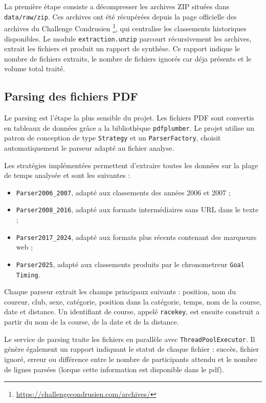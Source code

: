 \documentclass[12pt,a4paper]{article}
\begin{document}
La première étape consiste a décompresser les archives ZIP situées dans \texttt{data/raw/zip}. Ces archives ont été récupérées depuis la page officielle des archives du Challenge Condrusien \footnote{\url{https://challengecondrusien.com/archives/}}, qui centralise les classements historiques disponibles. Le module \texttt{extraction.unzip} parcourt récursivement les archives, extrait les fichiers et produit un rapport de synthèse. Ce rapport indique le nombre de fichiers extraits, le nombre de fichiers ignorés car déja présents et le volume total traité.

\subsection{Parsing des fichiers PDF}

Le parsing est l'étape la plus sensible du projet. Les fichiers PDF sont convertis en tableaux de données grâce a la bibliothèque \texttt{pdfplumber}. Le projet utilise un patron de conception de type \texttt{Strategy} et un \texttt{ParserFactory}, choisit automatiquement le parseur adapté au fichier analyse.

Les stratégies implémentées permettent d'extraire toutes les données sur la plage de temps analysée et sont les suivantes :

\begin{itemize}
    \item \texttt{Parser2006\_2007}, adapté aux classements des années 2006 et 2007 ;
    \item \texttt{Parser2008\_2016}, adapté aux formats intermédiaires sans URL dans le texte ;
    \item \texttt{Parser2017\_2024}, adapté aux formats plus récents contenant des marqueurs web ;
    \item \texttt{Parser2025}, adapté aux classements produits par le chronometreur \texttt{Goal Timing}.
\end{itemize}

Chaque parseur extrait les champs principaux suivants : position, nom du coureur, club, sexe, catégorie, position dans la catégorie, temps, nom de la course, date et distance. Un identifiant de course, appelé \texttt{racekey}, est ensuite construit a partir du nom de la course, de la date et de la distance.

Le service de parsing traite les fichiers en parallèle avec \texttt{ThreadPoolExecutor}. Il génère également un rapport indiquant le statut de chaque fichier : succès, fichier ignoré, erreur ou différence entre le nombre de participants attendu et le nombre de lignes parsées (lorque cette information est disponible dans le pdf).
\end{document}
